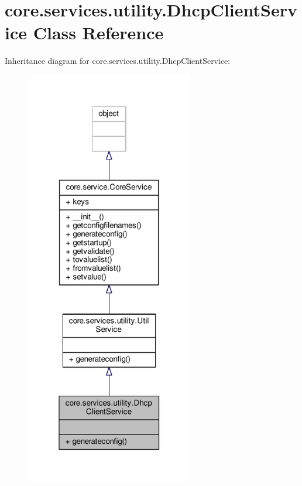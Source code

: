\hypertarget{classcore_1_1services_1_1utility_1_1_dhcp_client_service}{\section{core.\+services.\+utility.\+Dhcp\+Client\+Service Class Reference}
\label{classcore_1_1services_1_1utility_1_1_dhcp_client_service}
}


Inheritance diagram for core.\+services.\+utility.\+Dhcp\+Client\+Service\+:
\nopagebreak
\begin{figure}[H]
\begin{center}
\leavevmode
\includegraphics[width=208pt]{classcore_1_1services_1_1utility_1_1_dhcp_client_service__inherit__graph}
\end{center}
\end{figure}


